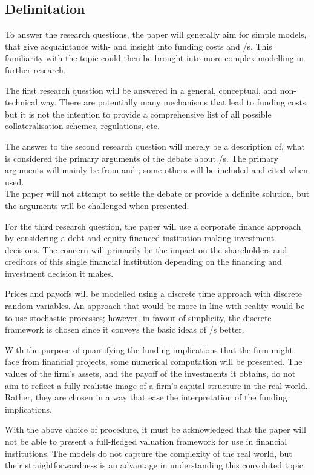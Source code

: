 \documentclass[main.tex]{subfiles}
\begin{document}
    \subsection{Delimitation}

    To answer the research questions, the paper will generally aim for simple models,
    that give acquaintance with- and insight into funding costs and \FVA/s.
    This familiarity with the topic could then be brought into more complex modelling
    in further research.

    The first research question will be answered in a general, conceptual, and 
    non-tech\-nical %
    way.
    There are potentially many mechanisms that lead to funding costs,
    but it is not the intention to provide a comprehensive list 
    of all possible collateralisation schemes, regulations, etc.

    The answer to the second research question will merely be a description 
    of, what is considered the primary arguments of the debate about \FVA/s.
    The primary arguments will mainly be from 
    \textcite{HullWhite2012FVA} and \textcite{Castagna2012FVA};
    some others will be included and cited when used.
    \\
    The paper will not attempt to settle the debate or provide a definite solution,
    but the arguments will be challenged when presented.

    For the third research question, the paper will use a corporate finance approach
    by considering a debt and equity financed institution making investment decisions.
    The concern will primarily be the impact on the shareholders and creditors 
    of this single financial institution depending on the financing and investment decision it makes.

    Prices and payoffs will be modelled using a discrete time approach 
    with discrete random variables.
    An approach that would be more in line with reality would be to use stochastic processes;
    however, in favour of simplicity, the discrete framework is chosen 
    since it conveys the basic ideas of \FVA/s better.

    With the purpose of quantifying the funding implications that the firm might face from financial projects,
    some numerical computation will be presented.
    The values of the firm's assets, and the payoff of the investments it obtains,
    do not aim to reflect a fully realistic image of a firm's capital structure in the real world.
    Rather, they are chosen in a way that ease the interpretation of the funding implications.

    With the above choice of procedure, it must be acknowledged that the paper will not be able to
    present a full-fledged valuation framework for use in financial institutions.
    The models do not capture the complexity of the real world,
    but their straightforwardness is an advantage in understanding this convoluted topic.
\end{document}
